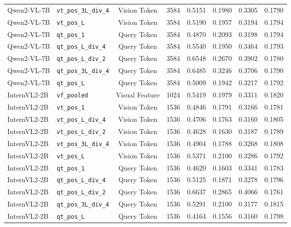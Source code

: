 \begin{table}[t]
\begin{tabular}{llcccccc}
Qwen2-VL-7B & \texttt{vt_pos_3L_div_4} & Vision Token & 3584 & 0.5151 & 0.1980 & 0.3305 & 0.1790 \\
Qwen2-VL-7B & \texttt{vt_pos_L} & Vision Token & 3584 & 0.5190 & 0.1957 & 0.3194 & 0.1794 \\
Qwen2-VL-7B & \texttt{qt_pos_1} & Query Token & 3584 & 0.4870 & 0.2093 & 0.3198 & 0.1794 \\
Qwen2-VL-7B & \texttt{qt_pos_L_div_4} & Query Token & 3584 & 0.5540 & 0.1950 & 0.3464 & 0.1793 \\
Qwen2-VL-7B & \texttt{qt_pos_L_div_2} & Query Token & 3584 & 0.6548 & 0.2670 & 0.3902 & 0.1780 \\
Qwen2-VL-7B & \texttt{qt_pos_3L_div_4} & Query Token & 3584 & 0.6485 & 0.3246 & 0.3706 & 0.1790 \\
Qwen2-VL-7B & \texttt{qt_pos_L} & Query Token & 3584 & 0.5009 & 0.1942 & 0.3217 & 0.1792 \\
\midrule
InternVL2-2B & \texttt{vf_pooled} & Visual Feature & 1024 & 0.5419 & 0.1979 & 0.3311 & 0.1820 \\
InternVL2-2B & \texttt{vt_pos_1} & Vision Token & 1536 & 0.4846 & 0.1791 & 0.3166 & 0.1781 \\
InternVL2-2B & \texttt{vt_pos_L_div_4} & Vision Token & 1536 & 0.4706 & 0.1763 & 0.3160 & 0.1805 \\
InternVL2-2B & \texttt{vt_pos_L_div_2} & Vision Token & 1536 & 0.4628 & 0.1630 & 0.3187 & 0.1789 \\
InternVL2-2B & \texttt{vt_pos_3L_div_4} & Vision Token & 1536 & 0.4904 & 0.1788 & 0.3268 & 0.1808 \\
InternVL2-2B & \texttt{vt_pos_L} & Vision Token & 1536 & 0.5371 & 0.2100 & 0.3286 & 0.1792 \\
InternVL2-2B & \texttt{qt_pos_1} & Query Token & 1536 & 0.4620 & 0.1603 & 0.3341 & 0.1783 \\
InternVL2-2B & \texttt{qt_pos_L_div_4} & Query Token & 1536 & 0.5125 & 0.1871 & 0.3278 & 0.1796 \\
InternVL2-2B & \texttt{qt_pos_L_div_2} & Query Token & 1536 & 0.6637 & 0.2865 & 0.4066 & 0.1761 \\
InternVL2-2B & \texttt{qt_pos_3L_div_4} & Query Token & 1536 & 0.5291 & 0.2100 & 0.3177 & 0.1815 \\
InternVL2-2B & \texttt{qt_pos_L} & Query Token & 1536 & 0.4164 & 0.1556 & 0.3160 & 0.1798 \\
\bottomrule
\end{tabular}
\end{table}